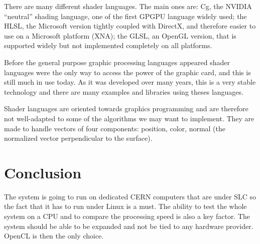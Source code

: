There are many different shader languages. The main ones are: Cg, the NVIDIA ``neutral'' shading language, one of the first \gls{GPGPU} language widely used; the \gls{HLSL}, the Microsoft version tightly coupled with DirectX, and therefore easier to use on a Microsoft platform (XNA); the \gls{GLSL}, an \gls{OpenGL} version, that is supported widely but not implemented completely on all platforms.

Before the general purpose graphic processing languages appeared shader languages were the only way to access the power of the graphic card, and this is still much in use today. As it was developed over many years, this is a very stable technology and there are many examples and libraries using theses languages.

Shader languages are oriented towards graphics programming and are therefore not well-adapted to some of the algorithms we may want to implement. They are made to handle vectors of four components: position, color, normal (the normalized vector perpendicular to the surface). 

\section{Conclusion}

The system is going to run on dedicated \gls{CERN} computers that are under \gls{SLC} so the fact that it has to run under Linux is a must. The ability to test the whole system on a \gls{CPU} and to compare the processing speed is also a key factor. The system should be able to be expanded and not be tied to any hardware provider. \Gls{OpenCL} is then the only choice.

